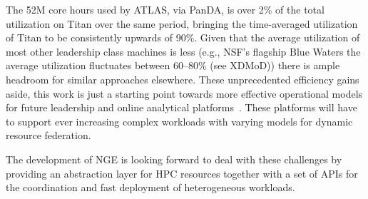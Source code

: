The 52M core hours used by ATLAS, via PanDA, is over 2\% of the total
utilization on Titan over the same period, bringing the time-averaged
utilization of Titan to be consistently upwards of 90\%. Given that the
 average utilization of most other leadership class machines is less
(e.g., NSF's flagship Blue Waters the average utilization fluctuates between
60--80\% (see XDMoD\cite{bw-sucks})) there is ample headroom for similar
approaches elsewhere. These unprecedented efficiency gains aside, this work
is just a starting point towards more effective operational models for future
leadership and online analytical platforms~\cite{foap-url}. These platforms
will have to support ever increasing complex workloads with varying models
for dynamic resource federation.

The development of NGE is looking forward to deal with these challenges by providing an abstraction layer for HPC resources together with a set of APIs for the coordination and fast deployment of heterogeneous workloads.   

